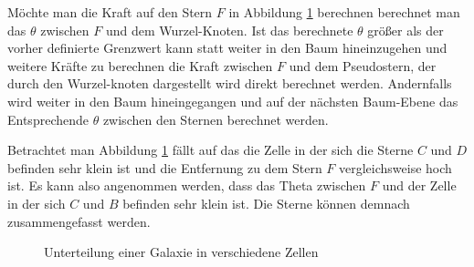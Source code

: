 \par Möchte man die Kraft auf den Stern \( F \) in Abbildung \ref{fig:cells}
berechnen berechnet man das \( \theta \) zwischen \( F \) und dem Wurzel-Knoten. Ist
das berechnete \( \theta \) größer als der vorher definierte Grenzwert kann statt
weiter in den Baum hineinzugehen und weitere Kräfte zu berechnen die Kraft
zwischen \( F \) und dem Pseudostern, der durch den Wurzel-knoten dargestellt wird
direkt berechnet werden. Andernfalls wird weiter in den Baum hineingegangen und
auf der nächsten Baum-Ebene das Entsprechende \( \theta \) zwischen den Sternen
berechnet werden.

\par Betrachtet man Abbildung \ref{fig:cells} fällt auf das die Zelle in der
sich die Sterne \( C \) und \( D \) befinden sehr klein ist und die Entfernung
zu dem Stern \( F \) vergleichsweise hoch ist. Es kann also angenommen werden,
dass das Theta zwischen \( F \) und der Zelle in der sich \( C \) und \( B \)
befinden sehr klein ist. Die Sterne können demnach zusammengefasst werden.

\bigskip

\begin{figure} 
\hspace{1.5cm}
\begin{minipage}{0.45\textwidth}
\end{minipage}
\caption{Unterteilung einer Galaxie in verschiedene Zellen}
\label{fig:cells}
\end{figure}


